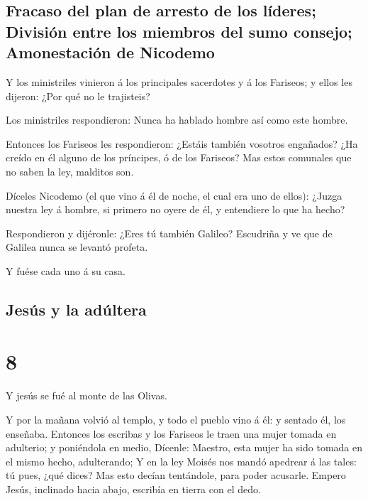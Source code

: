 \hypertarget{fracaso-del-plan-de-arresto-de-los-luxedderes-divisiuxf3n-entre-los-miembros-del-sumo-consejo-amonestaciuxf3n-de-nicodemo}{%
\subsection{Fracaso del plan de arresto de los líderes; División entre
los miembros del sumo consejo; Amonestación de
Nicodemo}\label{fracaso-del-plan-de-arresto-de-los-luxedderes-divisiuxf3n-entre-los-miembros-del-sumo-consejo-amonestaciuxf3n-de-nicodemo}}

 Y los ministriles vinieron á los principales sacerdotes y
á los Fariseos; y ellos les dijeron: ¿Por qué no le trajisteis?

 Los ministriles respondieron: Nunca ha hablado hombre así
como este hombre.

 Entonces los Fariseos les respondieron: ¿Estáis también
vosotros engañados?  ¿Ha creído en él alguno de los
príncipes, ó de los Fariseos?  Mas estos comunales que no
saben la ley, malditos son.

 Díceles Nicodemo (el que vino á él de noche, el cual era
uno de ellos):  ¿Juzga nuestra ley á hombre, si primero no
oyere de él, y entendiere lo que ha hecho?

 Respondieron y dijéronle: ¿Eres tú también Galileo?
Escudriña y ve que de Galilea nunca se levantó profeta.

 Y fuése cada uno á su casa.

\hypertarget{jesuxfas-y-la-aduxfaltera}{%
\subsection{Jesús y la adúltera}\label{jesuxfas-y-la-aduxfaltera}}

\hypertarget{section-7}{%
\section{8}\label{section-7}}

 Y jesús se fué al monte de las Olivas.

 Y por la mañana volvió al templo, y todo el pueblo vino á
él: y sentado él, los enseñaba.  Entonces los escribas y los
Fariseos le traen una mujer tomada en adulterio; y poniéndola en medio,
 Dícenle: Maestro, esta mujer ha sido tomada en el mismo
hecho, adulterando;  Y en la ley Moisés nos mandó apedrear á
las tales: tú pues, ¿qué dices?  Mas esto decían tentándole,
para poder acusarle. Empero Jesús, inclinado hacia abajo, escribía en
tierra con el dedo.

